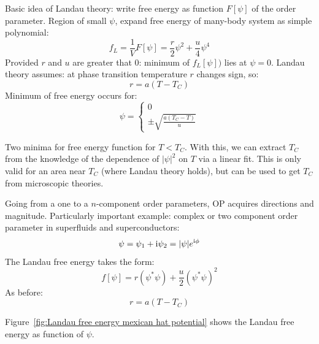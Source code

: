 \documentclass[../main.tex]{subfiles}
\begin{document}
Basic idea of Landau theory: write free energy as function \(F[\psi]\) of the order parameter.
Region of small \(\psi\), expand free energy of many-body system as simple polynomial:
\begin{equation}
	f_{L} = \frac{1}{V} F[\psi] = \frac{r}{2} \psi^2 + \frac{u}{4} \psi^4
\end{equation}
Provided \(r\) and \(u\) are greater that \(0\): minimum of \(f_L [\psi])\) lies at \(\psi = 0\).
Landau theory assumes: at phase transition temperature \(r\) changes sign, so:
\begin{equation}
	r = a(T - T_C)
\end{equation}
Minimum of free energy occurs for:
\begin{equation}
	\psi = \begin{cases}
		0 \\
		\pm \sqrt{\frac{a (T_C - T)}{u} }
	\end{cases}
\end{equation}

Two minima for free energy function for \(T < T_C\).
With this, we can extract \(T_C\) from the knowledge of the dependence of \(\vert \psi \vert^2\) on \(T\) via a linear fit.
This is only valid for an area near \(T_C\) (where Landau theory holds), but can be used to get \(T_C\) from microscopic theories.


Going from a one to a \(n\)-component order parameters, OP acquires directions and magnitude.
Particularly important example: complex or two component order parameter in superfluids and superconductors:
\begin{equation}
	\psi = \psi_1 + \mathrm{i} \psi_2 = \vert \psi \vert e^{\mathrm{i} \phi}
\end{equation}
The Landau free energy takes the form:
\begin{equation}
	f[\psi] = r(\psi^* \psi) + \frac{u}{2} (\psi^* \psi)^2
\end{equation}
As before:
\begin{equation}
	r = a(T - T_C)
\end{equation}

Figure~\ref{fig:Landau free energy mexican hat potential} shows the Landau free energy as function of \(\psi\).
\end{document}
